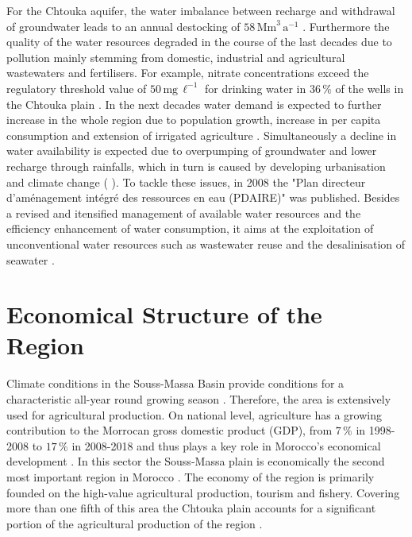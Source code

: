 For the Chtouka aquifer, the water imbalance between recharge and withdrawal of groundwater leads to an annual destocking of $58 \, \textrm{Mm}^3 \, \textrm{a}^{-1}$ \parencite{ABHSMD.2014}. 
Furthermore the quality of the water resources degraded in the course of the last decades due to pollution mainly stemming from domestic, industrial and agricultural wastewaters and fertilisers. 
For example, nitrate concentrations exceed the regulatory threshold value of $50 \, \textrm{mg} \, \ell^{-1}$ for drinking water in $36 \, \%$ of the wells in the Chtouka plain \parencite{Choukr.2017}. 
In the next decades water demand is expected to further increase in the whole region due to population growth, increase in per capita consumption and extension of irrigated agriculture \parencite{Choukr.2017}. 
Simultaneously a decline in water availability is expected due to overpumping of groundwater and lower recharge through rainfalls, which in turn is caused by developing urbanisation and climate change (\cite{Choukr.2017} \cite{Hssaisoune.2017}). 
To tackle these issues, in 2008 the "Plan directeur d'aménagement intégré des ressources en eau (PDAIRE)" was published. 
Besides a revised and itensified management of available water resources and the efficiency enhancement of water consumption, it aims at the exploitation of unconventional water resources such as wastewater reuse and the desalinisation of seawater \parencite{Choukr.2017}.

\section{Economical Structure of the Region}
\label{Sec-SouMaStructure}

Climate conditions in the Souss-Massa Basin provide conditions for a characteristic all-year round growing season \parencite{Hssaisoune.2017}. 
Therefore, the area is extensively used for agricultural production. 
On national level, agriculture has a growing contribution to the Morrocan gross domestic product (GDP), from $7 \, \%$ in 1998-2008 to $17 \, \%$ in 2008-2018 and thus plays a key role in Morocco's economical development \parencite{MarocVert.2021}. 
In this sector the Souss-Massa plain is economically the second most important region in Morocco \parencite{Choukr.2017}. 
The economy of the region is primarily founded on the high-value agricultural production, tourism and fishery. 
Covering more than one fifth of this area the Chtouka plain accounts for a significant portion of the agricultural production of the region \parencite{Choukr.2017}.

